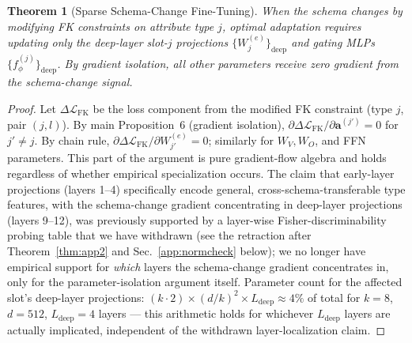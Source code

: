 \documentclass[conference]{IEEEtran}
\newtheorem{theorem}{Theorem}
\begin{document}
\begin{theorem}[Sparse Schema-Change Fine-Tuning]
\label{thm:app8}
When the schema changes by modifying FK constraints on attribute type $j$, optimal adaptation requires updating only the deep-layer slot-$j$ projections $\{W_j^{(e)}\}_{\mathrm{deep}}$ and gating MLPs $\{f_\phi^{(j)}\}_{\mathrm{deep}}$. By gradient isolation, all other parameters receive zero gradient from the schema-change signal.
\end{theorem}
\begin{proof}
	\renewcommand{\qedsymbol}{}
Let $\Delta\mathcal{L}_{\mathrm{FK}}$ be the loss component from the modified FK constraint (type $j$, pair $(j, l)$). By main Proposition~6 (gradient isolation), $\partial\Delta\mathcal{L}_{\mathrm{FK}}/\partial\mathbf{a}^{(j')} = 0$ for $j' \neq j$. By chain rule, $\partial\Delta\mathcal{L}_{\mathrm{FK}}/\partial W_{j'}^{(e)} = 0$; similarly for $W_V, W_O$, and FFN parameters. This part of the argument is pure gradient-flow algebra and holds regardless of whether empirical specialization occurs. The claim that early-layer projections (layers 1--4) specifically encode general, cross-schema-transferable type features, with the schema-change gradient concentrating in deep-layer projections (layers 9--12), was previously supported by a layer-wise Fisher-discriminability probing table that we have withdrawn (see the retraction after Theorem~\ref{thm:app2} and Sec.~\ref{app:normcheck} below); we no longer have empirical support for \emph{which} layers the schema-change gradient concentrates in, only for the parameter-isolation argument itself. Parameter count for the affected slot's deep-layer projections: $(k \cdot 2) \times (d/k)^2 \times L_{\mathrm{deep}} \approx 4\%$ of total for $k{=}8$, $d{=}512$, $L_{\mathrm{deep}}{=}4$ layers --- this arithmetic holds for whichever $L_{\mathrm{deep}}$ layers are actually implicated, independent of the withdrawn layer-localization claim.
\end{proof}
\end{document}
